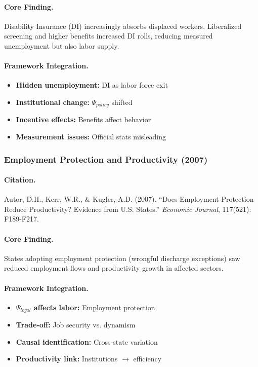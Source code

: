 \documentclass[12pt,a4paper]{article}
\begin{document}
\paragraph{Core Finding.}
Disability Insurance (DI) increasingly absorbs displaced workers.
Liberalized screening and higher benefits increased DI rolls,
reducing measured unemployment but also labor supply.

\paragraph{Framework Integration.}
\begin{itemize}
  \item \textbf{Hidden unemployment:} DI as labor force exit
  \item \textbf{Institutional change:} $\Psi_{policy}$ shifted
  \item \textbf{Incentive effects:} Benefits affect behavior
  \item \textbf{Measurement issues:} Official stats misleading
\end{itemize}

\subsubsection{Employment Protection and Productivity (2007)}

\paragraph{Citation.}
Autor, D.H., Kerr, W.R., \& Kugler, A.D. (2007). ``Does Employment
Protection Reduce Productivity? Evidence from U.S. States.''
\emph{Economic Journal}, 117(521): F189-F217.

\paragraph{Core Finding.}
States adopting employment protection (wrongful discharge exceptions)
saw reduced employment flows and productivity growth in affected sectors.

\paragraph{Framework Integration.}
\begin{itemize}
  \item \textbf{$\Psi_{legal}$ affects labor:} Employment protection
  \item \textbf{Trade-off:} Job security vs. dynamism
  \item \textbf{Causal identification:} Cross-state variation
  \item \textbf{Productivity link:} Institutions $\to$ efficiency
\end{itemize}
\end{document}
